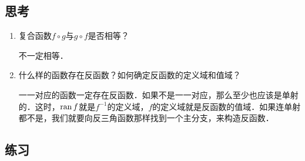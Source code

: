 \subsection*{思考}

\begin{enumerate}
\item 复合函数\(f \circ g\)与\(g \circ f\)是否相等？

  \ifshowsolp
    不一定相等．
  \fi

\item 什么样的函数存在反函数？如何确定反函数的定义域和值域？

  \ifshowsolp
    一一对应的函数一定存在反函数．如果不是一一对应，那么至少也应该是单射的．这时，\(\operatorname{ran} f\)就是\(f^{-1}\)的定义域，\(f\)的定义域就是反函数的值域．如果连单射都不是，我们就要向反三角函数那样找到一个主分支，来构造反函数．
  \fi
\end{enumerate}

\ifshowex
{}
\subsection*{练习}

